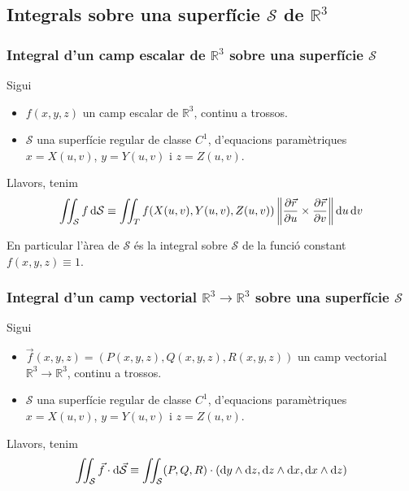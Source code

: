 \subsection{Integrals sobre una superfície $\mathcal{S}$ de $\mathbb{R}^{3}$}
\subsubsection*{Integral d'un camp escalar de $\mathbb{R}^{3}$ sobre una superfície $\mathcal{S}$}
\begin{defi}
	Sigui
	\begin{itemize}
		\item $f(x,y,z)$ un camp escalar de $\mathbb{R}^{3}$, continu a trossos.
		\item $\mathcal{S}$ una superfície regular de classe $C^{1}$, d'equacions paramètriques $x=X(u,v)$, $y=Y(u,v)$ i $z=Z(u,v)$.
	\end{itemize}
	Llavors, tenim
	\begin{align}
		\iint_{\mathcal{S}} f \mathop{}\!\mathrm{d} \mathcal{S} \equiv \iint_{T} f(X(u,v), Y(u,v), Z(u,v)) \left\| \frac{\partial \vec{r}}{\partial u} \times \frac{\partial \vec{r}}{\partial v} \right\| \mathop{}\!\mathrm{d} u \mathop{}\!\mathrm{d} v
	\end{align}
\end{defi}
En particular l'àrea de $\mathcal{S}$ és la integral sobre $\mathcal{S}$ de la funció constant $f(x,y,z) \equiv 1$.

\subsubsection*{Integral d'un camp vectorial $\mathbb{R}^{3} \to \mathbb{R}^{3}$ sobre una superfície $\mathcal{S}$}
\begin{defi}
	Sigui
	\begin{itemize}
		\item $\vec{f}(x,y,z) = (P(x,y,z), Q(x,y,z), R(x,y,z))$ un camp vectorial $\mathbb{R}^{3} \to \mathbb{R}^{3}$, continu a trossos.
		\item $\mathcal{S}$ una superfície regular de classe $C^{1}$, d'equacions paramètriques $x=X(u,v)$, $y=Y(u,v)$ i $z=Z(u,v)$.
	\end{itemize}
	Llavors, tenim
	\begin{align}
		\iint_{\mathcal{S}} \vec{f} \cdot \mathrm{d} \vec{\mathcal{S}} \equiv \iint_{\mathcal{S}} (P,Q,R) \cdot (\mathrm{d} y \wedge \mathrm{d} z, \mathrm{d} z \wedge \mathrm{d} x, \mathrm{d} x \wedge \mathrm{d} z) 
	\end{align}
\end{defi}

